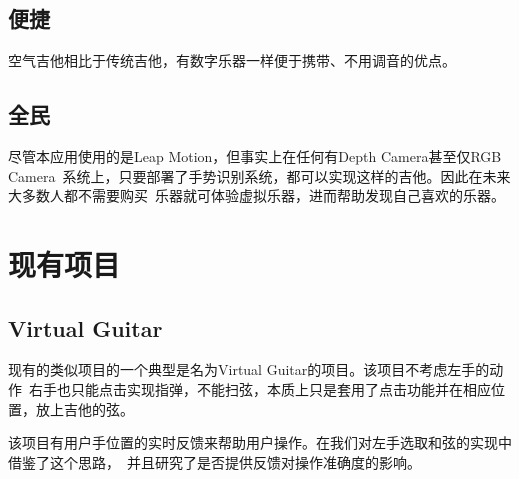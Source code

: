         \subsection{便捷}
        空气吉他相比于传统吉他，有数字乐器一样便于携带、不用调音的优点。

        \subsection{全民}
        尽管本应用使用的是Leap Motion，但事实上在任何有Depth Camera甚至仅RGB Camera\
        系统上，只要部署了手势识别系统，都可以实现这样的吉他。因此在未来大多数人都不需要购买\
        乐器就可体验虚拟乐器，进而帮助发现自己喜欢的乐器。

    \section{现有项目}

        \subsection{Virtual Guitar}
        现有的类似项目的一个典型是名为Virtual Guitar的项目。该项目不考虑左手的动作\
        右手也只能点击实现指弹，不能扫弦，本质上只是套用了点击功能并在相应位置，放上吉他的弦。

        该项目有用户手位置的实时反馈来帮助用户操作。在我们对左手选取和弦的实现中借鉴了这个思路，\
        并且研究了是否提供反馈对操作准确度的影响。

